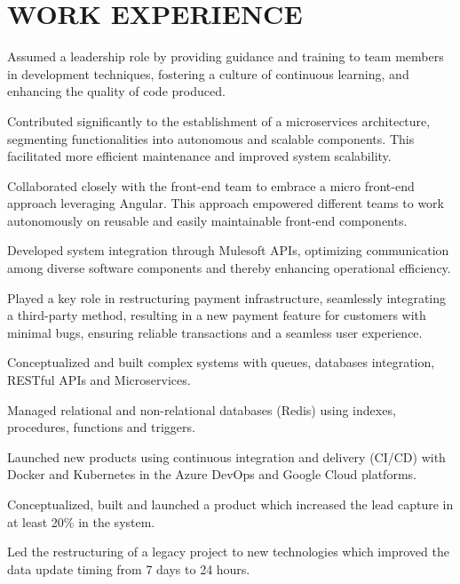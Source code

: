 \documentclass[]{deedy-resume-openfont}
\begin{document}
\hfill
\begin{minipage}[t]{0.66\textwidth} 


\section{WORK EXPERIENCE}
\vspace{\topsep} %
\begin{tightemize}
\item Assumed a leadership role by providing guidance and training to team members in development techniques, fostering a culture of continuous learning, and enhancing the quality of code produced.
\item Contributed significantly to the establishment of a microservices architecture, segmenting functionalities into autonomous and scalable components. This facilitated more efficient maintenance and improved system scalability.
\item Collaborated closely with the front-end team to embrace a micro front-end approach leveraging Angular. This approach empowered different teams to work autonomously on reusable and easily maintainable front-end components.
\item Developed system integration through Mulesoft APIs, optimizing communication among diverse software components and thereby enhancing operational efficiency.
\item Played a key role in restructuring payment infrastructure, seamlessly integrating a third-party method, resulting in a new payment feature for customers with minimal bugs, ensuring reliable transactions and a seamless user experience.
\end{tightemize}
\begin{tightemize}
\item Conceptualized and built complex systems with queues, databases integration, RESTful APIs and Microservices.
\item Managed relational and non-relational databases (Redis) using indexes, procedures, functions and triggers.
\item Launched new products using continuous integration and delivery (CI/CD) with Docker and Kubernetes in the Azure DevOps and Google Cloud platforms.
\item Conceptualized, built and launched a product which increased the lead capture in at least 20\% in the system. 
\item Led the restructuring of a legacy project to new technologies which improved the data update timing from 7 days to 24 hours.
\end{tightemize}
\sectionsep


\end{minipage}
\end{document}
